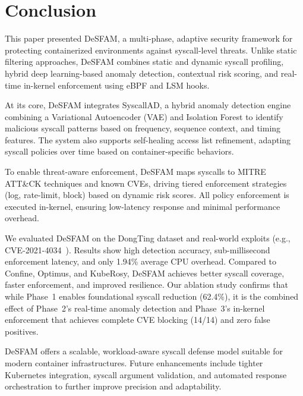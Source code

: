 \section{Conclusion}
\label{sec:conclusion}

This paper presented DeSFAM, a multi-phase, adaptive security framework for protecting
containerized environments against syscall-level threats. Unlike static filtering approaches,
DeSFAM combines static and dynamic syscall profiling, hybrid deep learning-based anomaly
detection, contextual risk scoring, and real-time in-kernel enforcement using eBPF and LSM hooks.

At its core, DeSFAM integrates SyscallAD, a hybrid anomaly detection engine combining a
Variational Autoencoder (VAE) and Isolation Forest to identify malicious syscall patterns based
on frequency, sequence context, and timing features. The system also supports self-healing
access list refinement, adapting syscall policies over time based on container-specific
behaviors.

To enable threat-aware enforcement, DeSFAM maps syscalls to MITRE ATT\&CK techniques and known
CVEs, driving tiered enforcement strategies (log, rate-limit, block) based on dynamic risk
scores. All policy enforcement is executed in-kernel, ensuring low-latency response and minimal
performance overhead.

We evaluated DeSFAM on the DongTing dataset and real-world exploits (e.g.,
CVE-2021-4034~\cite{cve_2021_4034}). Results show high detection accuracy, sub-millisecond
enforcement latency, and only 1.94\% average CPU overhead. Compared to Confine, Optimus, and
KubeRosy, DeSFAM achieves better syscall coverage, faster enforcement, and improved resilience.
Our ablation study confirms that while Phase~1 enables foundational syscall reduction (62.4\%),
it is the combined effect of Phase~2's real-time anomaly detection and Phase~3's in-kernel
enforcement that achieves complete CVE blocking (14/14) and zero false positives.

DeSFAM offers a scalable, workload-aware syscall defense model suitable for modern container
infrastructures. Future enhancements include tighter Kubernetes integration, syscall argument
validation, and automated response orchestration to further improve precision and adaptability.
